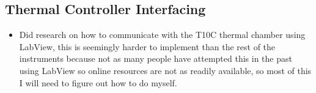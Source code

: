 \documentclass{article}
\begin{document}
\subsection*{Thermal Controller Interfacing}
\begin{itemize}
    \item Did research on how to communicate with the T10C thermal chamber using LabView, this is seemingly harder to implement than the rest of the instruments because not as many people have attempted this in the past using LabView so online resources are not as readily available, so most of this I will need to figure out how to do myself.
\end{itemize}
\end{document}
